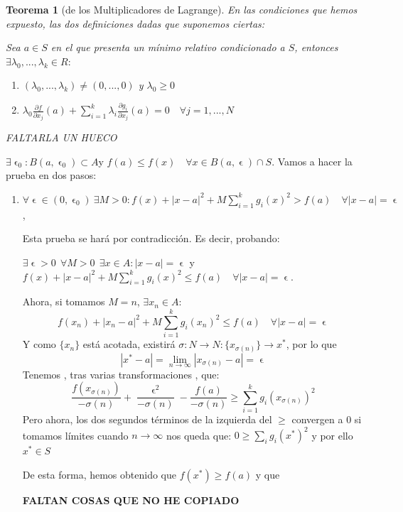 \documentclass[11pt, a4paper, titlepage]{article}
\makeatletter
\renewenvironment{proof}[1][\proofname] {\vspace{-15pt}\par\pushQED{\qed}\normalfont\topsep6\p@\@plus6\p@\relax\trivlist\item[\hskip\labelsep\it#1\@addpunct{.}]\ignorespaces}{\popQED\endtrivlist\@endpefalse}
\theoremstyle{theorem-style}
\newtheorem*{nth}{Teorema}
\theoremstyle{definition-style}
\theoremstyle{remark-style}
\theoremstyle{example-style}
\newenvironment{nlist}
{\begin{enumerate}
\renewcommand\labelenumi{(\emph{\roman{enumi})}}}
{\end{enumerate}}
\makeatother
\begin{document}
\begin{nth}[de los Multiplicadores de Lagrange]
	En las condiciones que hemos expuesto, las dos definiciones dadas que suponemos ciertas:
	
	Sea $a\in S$ en el que presenta un mínimo relativo condicionado a $S$, entonces $\exists \lambda_0,...,\lambda_k \in R:$
	\begin{nlist}
	\item $(\lambda_0,...,\lambda_k) \ne (0,...,0)$ y $\lambda_0 \geq 0$
	\item  $\lambda_0\frac{\partial f}{\partial x_j}(a)+\sum_{i=1}^k \lambda_i \frac{\partial g_i}{\partial x_j}(a) = 0 \quad \forall j=1,...,N$
\end{nlist}

FALTARLA UN HUECO
\end{nth}
\begin{proof}
	$\exists \upvarepsilon_0 : B(a,\upvarepsilon_0)\subset A $y $f(a) \leq f(x) \quad \forall x \in B(a,\upvarepsilon)\cap S$.
	Vamos a hacer la prueba en dos pasos:
	\begin{enumerate}
	\item $\forall \upvarepsilon \in (0,\upvarepsilon_0) \ \exists M > 0 : f(x) + |x-a|^2 + M \sum_{i=1}^kg_i(x)^2 > f(a) \quad \forall |x-a|= \upvarepsilon$,
	
	Esta prueba se hará por contradicción. Es decir, probando:
	
	$\exists \upvarepsilon > 0 \ \ \forall M> 0 \ \ \exists x\in A: |x-a|=\upvarepsilon$ y $f(x) + |x-a|^2 + M \sum_{i=1}^kg_i(x)^2 \leq f(a) \quad \forall |x-a|= \upvarepsilon$.
	
	Ahora, si tomamos $M=n$, $\exists x_n \in A:$
	\[
	f(x_n) + |x_n-a|^2 + M \sum_{i=1}^kg_i(x_n)^2 \leq f(a) \quad \forall |x-a|= \upvarepsilon
	\]
	Y como $\{x_n\}$ está acotada, existirá $\sigma :N \to N: \{x_{\sigma(n)}\}\to x^{*}$, por lo que 
	\[
	|x^{*}-a|= \lim_{n\to \infty}|x_{\sigma(n)}-a| = \upvarepsilon
	\]
	Tenemos , tras varias transformaciones , que:
	\[
	\frac{f(x_{\sigma(n)})}{-\sigma(n)}+\frac{\upvarepsilon^2}{-\sigma(n)}-\frac{f(a)}{-\sigma(n)} \geq \sum_{i=1}^k g_i(x_{\sigma(n)})^2
	\]
	Pero ahora, los dos segundos términos de la izquierda del $\geq$ convergen a 0 si tomamos límites cuando $n\to \infty$ nos queda que:
	$0 \geq \sum_i g_i (x^*)^2$ y por ello $x^* \in S$
	
	De esta forma, hemos obtenido que $f(x^*) \geq f(a)$ y que
	
	\textbf{FALTAN COSAS QUE NO HE COPIADO}
	

\end{enumerate}
\end{proof}
\end{document}

